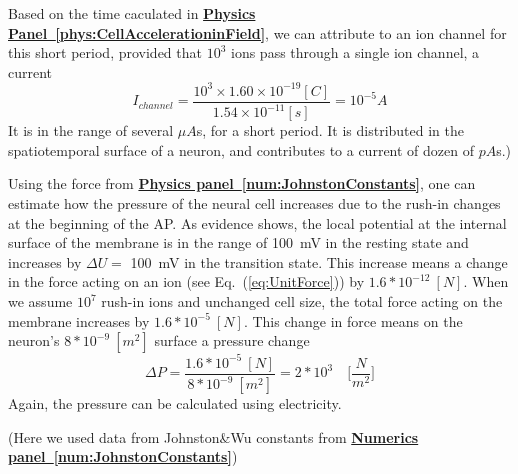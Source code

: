{
Based on the time caculated in \textbf{\hyperlink{phys:CellAccelerationinField}{Physics Panel~\ref{phys:CellAccelerationinField}}},
we can attribute to an ion channel for this short  period,
provided that $10^3$ ions pass through a single ion channel, a current
\begin{equation}
I_{channel} = \frac{10^3 \times 1.60\times 10^{-19} [C]}{1.54\times10^{-11}[s]} = 10^{-5} A
\end{equation}
\noindent
It is in the range of several $\mu A$s, for a short period. It is distributed in the
spatiotemporal surface of a neuron, and contributes to a current of dozen of $pA$s.)

%
}

{
Using the force from \textbf{\hyperlink{phys:CellForceinField}{Physics panel~\ref{num:JohnstonConstants}}}, one can estimate how the pressure of the neural cell increases due to the rush-in changes at the beginning of the
\gls{AP}. 
As evidence shows, the local potential at the internal surface of the membrane is in the range of \SI{100}{\milli\volt} in the resting state and increases by $\Delta U=$ \SI{100}{\milli\volt}  in the transition state. This increase means a change in the force acting on an ion (see Eq.~(\ref{eq:UnitForce})) by  $1.6*10^{-12}\ [N]$.
When we assume $10^7$ rush-in ions and unchanged cell size, the total force acting on the membrane increases by $1.6*10^{-5}\ [N]$.
This change in force means on the neuron's $8*10^{-9}\ [m^2]$ surface  a pressure change 
\begin{equation}
	\Delta P = \frac{1.6*10^{-5}\ [N]}{8*10^{-9}\ [m^2]}
	= 2*10^{3}\quad \biggl[\frac{N}{m^2}\biggr]
	\label{eq:CellPressureChange}
\end{equation}
\noindent Again, the pressure can be calculated 
using electricity.

(Here we used data from Johnston\&Wu constants from \textbf{\hyperlink{num:JohnstonConstants}{Numerics panel~\ref{num:JohnstonConstants}}})
}

